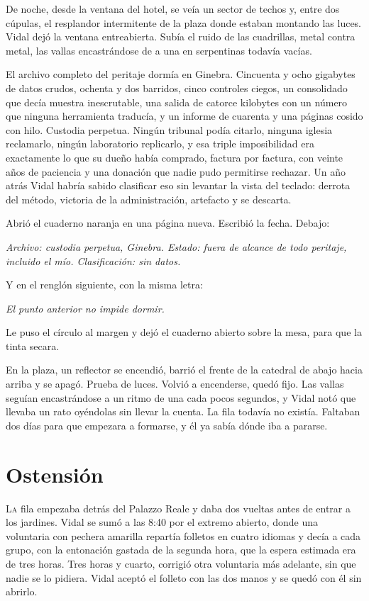 \scenebreak


De noche, desde la ventana del hotel, se veía un sector de techos y, entre dos cúpulas, el resplandor intermitente de la plaza donde estaban montando las luces. Vidal dejó la ventana entreabierta. Subía el ruido de las cuadrillas, metal contra metal, las vallas encastrándose de a una en serpentinas todavía vacías.

El archivo completo del peritaje dormía en Ginebra. Cincuenta y ocho gigabytes de datos crudos, ochenta y dos barridos, cinco controles ciegos, un consolidado que decía muestra inescrutable, una salida de catorce kilobytes con un número que ninguna herramienta traducía, y un informe de cuarenta y una páginas cosido con hilo. Custodia perpetua. Ningún tribunal podía citarlo, ninguna iglesia reclamarlo, ningún laboratorio replicarlo, y esa triple imposibilidad era exactamente lo que su dueño había comprado, factura por factura, con veinte años de paciencia y una donación que nadie pudo permitirse rechazar. Un año atrás Vidal habría sabido clasificar eso sin levantar la vista del teclado: derrota del método, victoria de la administración, artefacto y se descarta.

Abrió el cuaderno naranja en una página nueva. Escribió la fecha. Debajo:

\textit{Archivo: custodia perpetua, Ginebra. Estado: fuera de alcance de todo peritaje, incluido el mío. Clasificación: sin datos.}

Y en el renglón siguiente, con la misma letra:

\textit{El punto anterior no impide dormir.}

Le puso el círculo al margen y dejó el cuaderno abierto sobre la mesa, para que la tinta secara.

En la plaza, un reflector se encendió, barrió el frente de la catedral de abajo hacia arriba y se apagó. Prueba de luces. Volvió a encenderse, quedó fijo. Las vallas seguían encastrándose a un ritmo de una cada pocos segundos, y Vidal notó que llevaba un rato oyéndolas sin llevar la cuenta. La fila todavía no existía. Faltaban dos días para que empezara a formarse, y él ya sabía dónde iba a pararse.

\clearpage

\chapter{Ostensión}

\lettrine[lines=2, lhang=0.1, nindent=0.2em]{L}{a} fila empezaba detrás del Palazzo Reale y daba dos vueltas antes de entrar a los jardines. Vidal se sumó a las 8:40 por el extremo abierto, donde una voluntaria con pechera amarilla repartía folletos en cuatro idiomas y decía a cada grupo, con la entonación gastada de la segunda hora, que la espera estimada era de tres horas. Tres horas y cuarto, corrigió otra voluntaria más adelante, sin que nadie se lo pidiera. Vidal aceptó el folleto con las dos manos y se quedó con él sin abrirlo.


